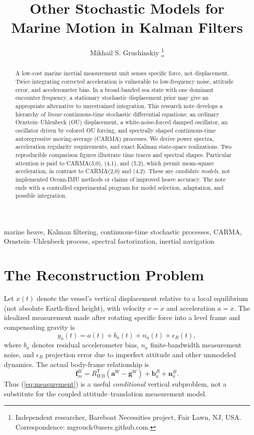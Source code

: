 \documentclass[10pt,journal]{IEEEtran}
\title{Other Stochastic Models for Marine Motion in Kalman Filters}
\author{Mikhail S. Grushinskiy%
\thanks{Independent researcher, Bareboat Necessities project, Fair Lawn, NJ, USA.
Correspondence: mgrouch@users.github.com.}}
\begin{document}
\maketitle

\begin{abstract}
A low-cost marine inertial measurement unit senses specific force, not
displacement. Twice integrating corrected acceleration is vulnerable to
low-frequency noise, attitude error, and accelerometer bias. In a broad-banded
sea state with one dominant encounter frequency, a stationary stochastic
displacement prior may give an appropriate alternative to unrestrained
integration. This research note develops a hierarchy of \emph{linear}
continuous-time stochastic differential equations: an ordinary
Ornstein--Uhlenbeck (OU) displacement, a white-noise-forced damped oscillator,
an oscillator driven by colored OU forcing, and spectrally shaped continuous-time
autoregressive moving-average (CARMA) processes. We derive power spectra,
acceleration regularity requirements, and exact Kalman state-space
realizations. Two reproducible comparison figures illustrate time traces and
spectral shapes. Particular attention is paid to CARMA(3,0), (4,1), and (5,2),
which permit mean-square acceleration, in contrast to CARMA(2,0) and (4,2).
These are \emph{candidate models}, not implemented Ocean-IMU methods or claims
of improved heave accuracy. The note ends with a controlled experimental
program for model selection, adaptation, and possible integration.
\end{abstract}

\begin{IEEEkeywords}
marine heave, Kalman filtering, continuous-time stochastic processes,
CARMA, Ornstein--Uhlenbeck process, spectral factorization, inertial navigation
\end{IEEEkeywords}

\section{The Reconstruction Problem}
Let \(x(t)\) denote the vessel's vertical displacement relative to a
local equilibrium (not absolute Earth-fixed height), with velocity \(v=\dot x\)
and acceleration \(a=\ddot x\). The idealized measurement made after rotating
specific force into a level frame and compensating gravity is
\begin{equation}
y_a(t)=a(t)+b_a(t)+n_a(t)+\epsilon_R(t),
\label{eq:measurement}
\end{equation}
where \(b_a\) denotes residual accelerometer bias, \(n_a\) finite-bandwidth
measurement noise, and \(\epsilon_R\) projection error due to imperfect
attitude and other unmodeled dynamics. The actual body-frame relationship is
\begin{equation}
\mathbf f_m^B=R_{WB}^{\mathsf T}
  (\mathbf a^W-\mathbf g^W)+\mathbf b_a^B+\mathbf n_a^B.
\label{eq:body-meas}
\end{equation}
Thus (\ref{eq:measurement}) is a useful \emph{conditional} vertical subproblem,
not a substitute for the coupled attitude--translation measurement model.
\end{document}
